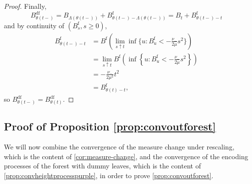 \begin{proof}
Finally, 
$$B^{\mathrm{df}}_{\theta(t-)}=B_{\Lambda(\theta(t-))}+B^{\mathrm{f}}_{\theta(t-)-\Lambda(\theta(t-))}
=B_{t}+B^{\mathrm{f}}_{\theta(t-)-t}$$
and by continuity of $(B^{\mathrm{f}}_s,s\geq 0)$,
\begin{align*}B^{\mathrm{f}}_{\theta(t-)-t}&=B^{\mathrm{f}}\left({\lim_{s\uparrow t}\inf\{u:B^{\mathrm{f}}_u<-\frac{\nu_-}{2\mu} s^2\}}\right)\\&=\lim_{s\uparrow t} B^{\mathrm{f}}\left({\inf\left\{u:B^{\mathrm{f}}_u<-\frac{\nu_-}{2\mu} s^2\right\}}\right)\\&= -\frac{\nu_-}{2\mu^2}t^2\\
&=B^{\mathrm{f}}_{\theta(t)-t}, \end{align*}
so 
$B^{\mathrm{df}}_{\theta(t-)}=B^{\mathrm{df}}_{\theta(t)}.$
\end{proof}





\subsection{Proof of Proposition \ref{prop:convoutforest}}\label{subsubsec.convaftermeasurechange}
We will now combine the convergence of the measure change under rescaling, which is the content of \cref{cor:measure-change}, and the convergence of the encoding processes of the forest with dummy leaves, which is the content of \cref{prop:convheightprocesspurple}, in order to prove \cref{prop:convoutforest}.

